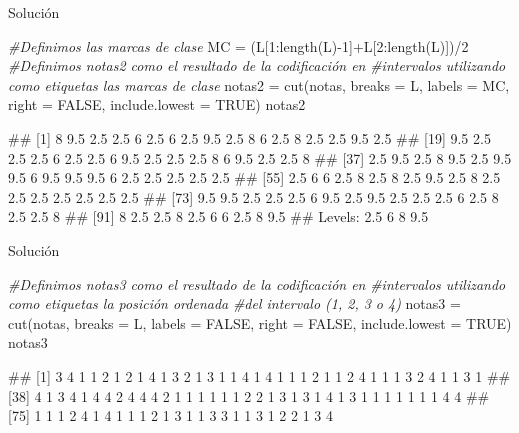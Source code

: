 \documentclass[
  ignorenonframetext,
  aspectratio=169]{beamer}
\newenvironment{Shaded}{\begin{snugshade}}{\end{snugshade}}
\newcommand{\AttributeTok}[1]{\textcolor[rgb]{0.77,0.63,0.00}{#1}}
\newcommand{\CommentTok}[1]{\textcolor[rgb]{0.56,0.35,0.01}{\textit{#1}}}
\newcommand{\ConstantTok}[1]{\textcolor[rgb]{0.00,0.00,0.00}{#1}}
\newcommand{\DecValTok}[1]{\textcolor[rgb]{0.00,0.00,0.81}{#1}}
\newcommand{\FunctionTok}[1]{\textcolor[rgb]{0.00,0.00,0.00}{#1}}
\newcommand{\NormalTok}[1]{#1}
\newcommand{\OtherTok}[1]{\textcolor[rgb]{0.56,0.35,0.01}{#1}}
\newcommand{\SpecialCharTok}[1]{\textcolor[rgb]{0.00,0.00,0.00}{#1}}
\let\oldverbatim\verbatim
\let\endoldverbatim\endverbatim
\renewenvironment{verbatim}{\tiny\oldverbatim}{\endoldverbatim}
\begin{document}
\begin{frame}[fragile]{Solución}
\protect\hypertarget{soluciuxf3n-18}{}
\begin{Shaded}
\begin{Highlighting}[]
\CommentTok{\#Definimos las marcas de clase}
\NormalTok{MC }\OtherTok{=}\NormalTok{ (L[}\DecValTok{1}\SpecialCharTok{:}\FunctionTok{length}\NormalTok{(L)}\SpecialCharTok{{-}}\DecValTok{1}\NormalTok{]}\SpecialCharTok{+}\NormalTok{L[}\DecValTok{2}\SpecialCharTok{:}\FunctionTok{length}\NormalTok{(L)])}\SpecialCharTok{/}\DecValTok{2}
\CommentTok{\#Definimos notas2 como el resultado de la codificación en }
\CommentTok{\#intervalos utilizando como etiquetas las marcas de clase}
\NormalTok{notas2 }\OtherTok{=} \FunctionTok{cut}\NormalTok{(notas, }\AttributeTok{breaks =}\NormalTok{ L, }\AttributeTok{labels =}\NormalTok{ MC, }\AttributeTok{right =} \ConstantTok{FALSE}\NormalTok{, }
             \AttributeTok{include.lowest =} \ConstantTok{TRUE}\NormalTok{)}
\NormalTok{notas2}
\end{Highlighting}
\end{Shaded}

\begin{verbatim}
##   [1] 8   9.5 2.5 2.5 6   2.5 6   2.5 9.5 2.5 8   6   2.5 8   2.5 2.5 9.5 2.5
##  [19] 9.5 2.5 2.5 2.5 6   2.5 2.5 6   9.5 2.5 2.5 2.5 8   6   9.5 2.5 2.5 8  
##  [37] 2.5 9.5 2.5 8   9.5 2.5 9.5 9.5 6   9.5 9.5 9.5 6   2.5 2.5 2.5 2.5 2.5
##  [55] 2.5 6   6   2.5 8   2.5 8   2.5 9.5 2.5 8   2.5 2.5 2.5 2.5 2.5 2.5 2.5
##  [73] 9.5 9.5 2.5 2.5 2.5 6   9.5 2.5 9.5 2.5 2.5 2.5 6   2.5 8   2.5 2.5 8  
##  [91] 8   2.5 2.5 8   2.5 6   6   2.5 8   9.5
## Levels: 2.5 6 8 9.5
\end{verbatim}
\end{frame}

\begin{frame}[fragile]{Solución}
\protect\hypertarget{soluciuxf3n-19}{}
\begin{Shaded}
\begin{Highlighting}[]
\CommentTok{\#Definimos notas3 como el resultado de la codificación en }
\CommentTok{\#intervalos utilizando como etiquetas la posición ordenada }
\CommentTok{\#del intervalo (1, 2, 3 o 4)}
\NormalTok{notas3 }\OtherTok{=} \FunctionTok{cut}\NormalTok{(notas, }\AttributeTok{breaks =}\NormalTok{ L, }\AttributeTok{labels =} \ConstantTok{FALSE}\NormalTok{, }\AttributeTok{right =} \ConstantTok{FALSE}\NormalTok{, }
             \AttributeTok{include.lowest =} \ConstantTok{TRUE}\NormalTok{)}
\NormalTok{notas3}
\end{Highlighting}
\end{Shaded}

\begin{verbatim}
##   [1] 3 4 1 1 2 1 2 1 4 1 3 2 1 3 1 1 4 1 4 1 1 1 2 1 1 2 4 1 1 1 3 2 4 1 1 3 1
##  [38] 4 1 3 4 1 4 4 2 4 4 4 2 1 1 1 1 1 1 2 2 1 3 1 3 1 4 1 3 1 1 1 1 1 1 1 4 4
##  [75] 1 1 1 2 4 1 4 1 1 1 2 1 3 1 1 3 3 1 1 3 1 2 2 1 3 4
\end{verbatim}
\end{frame}
\end{document}
